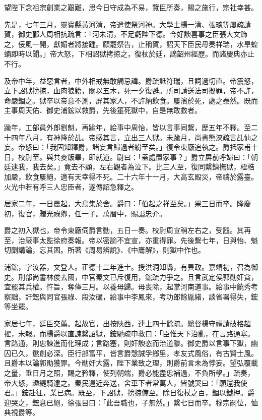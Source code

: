 \begin{pinyinscope}
{{望陛下念祖宗創業之艱難，思今日守成為不易，覽臣所奏，賜之施行，宗社幸甚。

先是，七年三月，靈寶縣黃河清，帝遣使祭河神。大學士楊一清、張璁等屢疏請賀，御史鄞人周相抗疏言：「河未清，不足虧陛下德。今好諛喜事之臣張大文飾之，佞風一開，獻媚者將接踵。願罷祭告，止稱賀，詔天下臣民毋奏祥瑞，水旱蝗蝻即時以聞。」帝大怒，下相詔獄拷掠之，復杖於廷，謫韶州經歷。而諸慶典亦止不行。

及帝中年，益惡言者，中外相戒無敢觸忌諱。爵疏詆符瑞，且詞過切直。帝震怒，立下詔獄搒掠，血肉狼籍，關以五木，死一夕復甦。所司請送法司擬罪，帝不許，命嚴錮之。獄卒以帝意不測，屏其家人，不許納飲食。屢濱於死，處之泰然。既而主事周天佑、御史浦鋐以救爵，先後箠死獄中，自是無敢救者。

踰年，工部員外郎劉魁，再踰年，給事中周怡，皆以言事同繫，歷五年不釋。至二十四年八月，有神降於乩。帝感其言，立出三人獄。未踰月，尚書熊浹疏言乩仙之妄。帝怒曰：「我固知釋爵，諸妄言歸過者紛至矣。」復令東廠追執之。爵抵家甫十日，校尉至。與共麥飯畢，即就道。尉曰：「盍處置家事？」爵立屏前呼婦曰：「朝廷逮我，我去矣。」竟去不顧，左右觀者為泣下。比三人至，復同繫鎮撫獄，桎梏加嚴，飲食屢絕，適有天幸得不死。二十六年十一月，大高玄殿災，帝禱於露臺。火光中若有呼三人忠臣者，遂傳詔急釋之。

居家二年，一日晨起，大鳥集於舍。爵曰：「伯起之祥至矣。」果三日而卒。隆慶初，復官，贈光祿卿，任一子。萬曆中，賜謚忠介。

爵之初入獄也，帝令東廠伺爵言動，五日一奏。校尉周宣稍左右之，受譴。其再至，治廠事太監徐府奏報。帝以密諭不宜宣，亦重得罪。先後繫七年，日與怡、魁切劘講論，忘其困。所著《周易辨說》、《中庸解》，則獄中作也。

浦鋐，字汝器，文登人。正德十二年進士。授洪洞知縣，有異政。嘉靖初，召為御史。刑部尚書林俊去國，中官秦文已斥復用，鋐疏力爭之。且言武定侯郭勛奸貪，宜罷其兵權。忤旨，奪俸三月。以養母歸。母喪除，起掌河南道事。給事中饒秀考察黜，訐鋐與同官張祿、段汝礪，給事中李鳳來，考功郎餘胤緒，談省署得失，鋐等坐罷。

家居七年，廷臣交薦。起故官，出按陜西，連上四十餘疏。總督楊守禮請破格超擢，未報。而楊爵以直諫繫詔獄，鋐馳疏申救曰：「臣惟天下治亂，在言路通塞。言路通，則忠諫進而化理成；言路塞，則奸諛恣而治道隳。御史爵以言事下獄，幽囚已久，懲創必深。臣行部富平，皆言爵愨誠孚鄉里，孝友式風俗，有古賢士風。且爵本以論郭勛獲罪。今勛奸大露，陛下業致之理，則爵前言未為悖妄。望弘覆載之量，垂日月之照，賜之矜釋，使列朝端，爵必能盡忠補過，不負所學。」疏奏，帝大怒，趣緹騎逮之。秦民遠近奔送，舍車下者常萬人，皆號哭曰：「願還我使君。」鋐赴征，業已病。既至，下詔獄，搒掠備至。除日復杖之百，錮以鐵柙。爵迎哭之，鋐息已絕，徐張目曰：「此吾職也，子無然。」繫七日而卒。穆宗嗣位，恤典視爵等。

}}
\end{pinyinscope}

